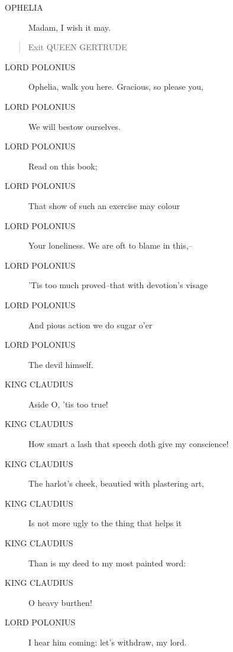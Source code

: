 \documentclass{article}
\begin{document}
\begin{description}
            
\item[OPHELIA] Madam, I wish it may.
\end{description}
          
\begin{quote}
Exit QUEEN GERTRUDE
\end{quote}
          
\begin{description}
            
\item[LORD POLONIUS] Ophelia, walk you here. Gracious, so please you,
\item[LORD POLONIUS] We will bestow ourselves.
\item[LORD POLONIUS] Read on this book;
\item[LORD POLONIUS] That show of such an exercise may colour
\item[LORD POLONIUS] Your loneliness. We are oft to blame in this,--
\item[LORD POLONIUS] 'Tis too much proved--that with devotion's visage
\item[LORD POLONIUS] And pious action we do sugar o'er
\item[LORD POLONIUS] The devil himself.
\end{description}
          
\begin{description}
            
\item[KING CLAUDIUS] 
               Aside          O, 'tis too true!
\item[KING CLAUDIUS] How smart a lash that speech doth give my conscience!
\item[KING CLAUDIUS] The harlot's cheek, beautied with plastering art,
\item[KING CLAUDIUS] Is not more ugly to the thing that helps it
\item[KING CLAUDIUS] Than is my deed to my most painted word:
\item[KING CLAUDIUS] O heavy burthen!
\end{description}
          
\begin{description}
            
\item[LORD POLONIUS] I hear him coming: let's withdraw, my lord.
\end{description}
          
\end{document}

